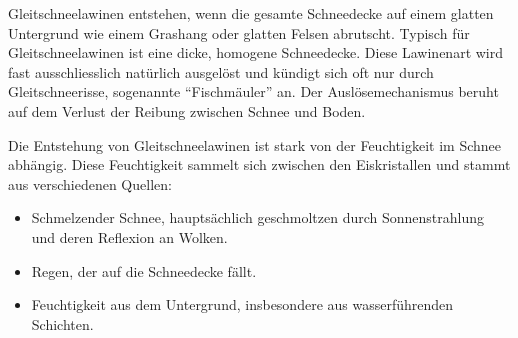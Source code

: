 


Gleitschneelawinen entstehen, wenn die gesamte Schneedecke auf einem glatten Untergrund wie einem Grashang oder glatten Felsen abrutscht. Typisch für Gleitschneelawinen ist eine dicke, homogene Schneedecke. Diese Lawinenart wird fast ausschliesslich natürlich ausgelöst und kündigt sich oft nur durch Gleitschneerisse, sogenannte “Fischmäuler” an. Der Auslösemechanismus beruht auf dem Verlust der Reibung zwischen Schnee und Boden. \cite{Mitterer.202}

Die Entstehung von Gleitschneelawinen ist stark von der Feuchtigkeit im Schnee abhängig. Diese Feuchtigkeit sammelt sich zwischen den Eiskristallen und stammt aus verschiedenen Quellen:

\begin{itemize}
    \item Schmelzender Schnee, hauptsächlich geschmoltzen durch Sonnenstrahlung und deren Reflexion an Wolken.
    \item Regen, der auf die Schneedecke fällt.
    \item Feuchtigkeit aus dem Untergrund, insbesondere aus wasserführenden Schichten.

\end{itemize}
